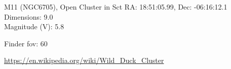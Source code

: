 \begin{block}{M11 (NGC6705), Open Cluster in Sct}
    RA: 18:51:05.99, Dec: -06:16:12.1 \\ 
    Dimensions: 9.0 \\ 
    Magnitude (V): 5.8



    Finder fov: 60 

    \url{https://en.wikipedia.org/wiki/Wild_Duck_Cluster} 
\end{block}